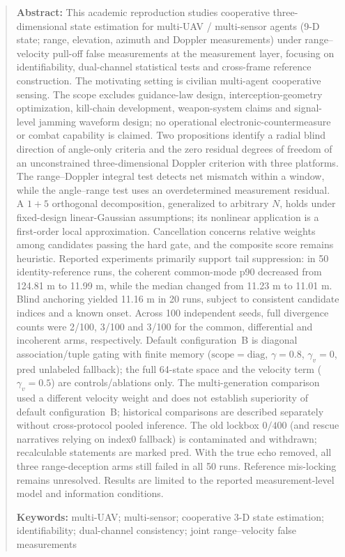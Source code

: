 \documentclass[UTF8,a4paper,zihao=-4]{ctexart}
\begin{document}
\begin{quote}\small
\textbf{Abstract:} This academic reproduction studies cooperative three-dimensional state estimation for multi-UAV / multi-sensor agents (9-D state; range, elevation, azimuth and Doppler measurements) under range--velocity pull-off false measurements at the measurement layer, focusing on identifiability, dual-channel statistical tests and cross-frame reference construction. The motivating setting is civilian multi-agent cooperative sensing. The scope excludes guidance-law design, interception-geometry optimization, kill-chain development, weapon-system claims and signal-level jamming waveform design; no operational electronic-countermeasure or combat capability is claimed. Two propositions identify a radial blind direction of angle-only criteria and the zero residual degrees of freedom of an unconstrained three-dimensional Doppler criterion with three platforms. The range--Doppler integral test detects net mismatch within a window, while the angle--range test uses an overdetermined measurement residual. A \(1+5\) orthogonal decomposition, generalized to arbitrary \(N\), holds under fixed-design linear-Gaussian assumptions; its nonlinear application is a first-order local approximation. Cancellation concerns relative weights among candidates passing the hard gate, and the composite score remains heuristic. Reported experiments primarily support tail suppression: in 50 identity-reference runs, the coherent common-mode p90 decreased from 124.81 m to 11.99 m, while the median changed from 11.23 m to 11.01 m. Blind anchoring yielded 11.16 m in 20 runs, subject to consistent candidate indices and a known onset. Across 100 independent seeds, full divergence counts were 2/100, 3/100 and 3/100 for the common, differential and incoherent arms, respectively. Default configuration~B is diagonal association/tuple gating with finite memory ($\mathrm{scope}=\mathrm{diag}$, $\gamma=0.8$, $\gamma_v=0$, pred unlabeled fallback); the full 64-state space and the velocity term ($\gamma_v=0.5$) are controls/ablations only. The multi-generation comparison used a different velocity weight and does not establish superiority of default configuration~B; historical comparisons are described separately without cross-protocol pooled inference. The old lockbox $0/400$ (and rescue narratives relying on index0 fallback) is contaminated and withdrawn; recalculable statements are marked pred. With the true echo removed, all three range-deception arms still failed in all 50 runs. Reference mis-locking remains unresolved. Results are limited to the reported measurement-level model and information conditions.

\textbf{Keywords:} multi-UAV; multi-sensor; cooperative 3-D state estimation; identifiability; dual-channel consistency; joint range--velocity false measurements
\end{quote}
\end{document}

